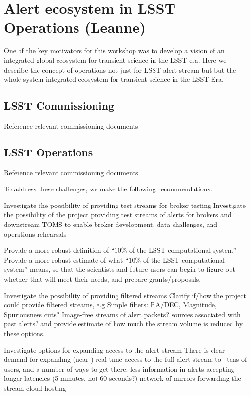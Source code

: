 \section{Alert ecosystem in LSST Operations (Leanne)} \label{sec:conops}
One of the key motivators for this workshop was to develop a vision of an integrated global ecosystem for transient science in the LSST era. Here we describe the concept of operations not just for LSST alert stream but but the whole system integrated ecosystem for transient science in the LSST Era. 


\subsection{LSST Commissioning}
Reference relevant commissioning documents

\subsection{LSST Operations}
Reference relevant commissioning documents


To address these challenges, we make the following recommendations:

{Investigate the possibility of providing test streams for broker testing}
{Investigate the possibility of the project providing test streams of alerts for brokers and downstream TOMS to enable broker development, data challenges, and operations rehearsals
}

{Provide a more robust definition of “10\% of the LSST computational system”}
{Provide a more robust estimate of what “10\% of the LSST computational system” means, so that the scientists and future users can begin to figure out whether that will meet their needs, and prepare grants/proposals.
}

{Investigate the possibility of providing filtered streams}
{Clarify if/how the project could provide filtered streams, e.g
Simple filters: RA/DEC, Magnitude, Spuriousness cuts?
Image-free streams of alert packets?
sources associated with past alerts?
and provide estimate of how much the stream volume is reduced by these options.
}

{Investigate options for expanding access to the alert stream}
{There is clear demand for expanding (near-) real time access to the full alert stream to ~tens of users, and a number of ways to get there:
less information in alerts
accepting longer latencies (5 minutes, not 60 seconds?)
network of mirrors forwarding the stream
cloud hosting}